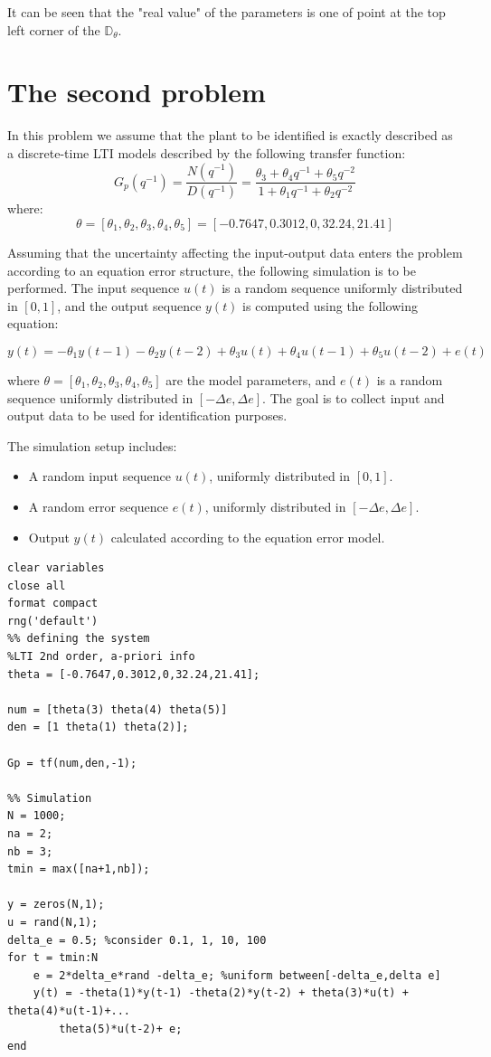 It can be seen that the "real value" of the parameters is one of point at the top left corner of the \(\mathbb{D}_\theta\).

\section{The second problem}
In this problem we assume that the plant to be identified is exactly described as a discrete-time
LTI models described by the following transfer function:
\[
G_p(q^{-1}) = \frac{N(q^{-1})}{D(q^{-1})} = \frac{\theta_3 + \theta_4 q^{-1} + \theta_5 q^{-2}}{1 + \theta_1 q^{-1} + \theta_2 q^{-2}} \tag{5}
\]
where:
\[
\theta = [\theta_1, \theta_2, \theta_3, \theta_4, \theta_5] = [-0.7647, 0.3012, 0, 32.24, 21.41]
\]


Assuming that the uncertainty affecting the input-output data enters the problem according to an equation error structure, the following simulation is to be performed. The input sequence \( u(t) \) is a random sequence uniformly distributed in \([0, 1]\), and the output sequence \( y(t) \) is computed using the following equation:

\[
    y(t) = -\theta_1 y(t-1) - \theta_2 y(t-2) + \theta_3 u(t) + \theta_4 u(t-1) + \theta_5 u(t-2) + e(t) \tag{7}
\]

where \( \theta = [\theta_1, \theta_2, \theta_3, \theta_4, \theta_5] \) are the model parameters, and \( e(t) \) is a random sequence uniformly distributed in \([- \Delta e, \Delta e]\). The goal is to collect input and output data to be used for identification purposes.

The simulation setup includes:
\begin{itemize}
    \item A random input sequence \( u(t) \), uniformly distributed in \([0, 1]\).
    \item A random error sequence \( e(t) \), uniformly distributed in \([- \Delta e, \Delta e]\).
    \item Output \( y(t) \) calculated according to the equation error model.
\end{itemize}


\begin{example}
\begin{lstlisting}[caption=Set-membership estimation with theta bounds and simulation]
clear variables
close all
format compact
rng('default')
%% defining the system
%LTI 2nd order, a-priori info
theta = [-0.7647,0.3012,0,32.24,21.41];

num = [theta(3) theta(4) theta(5)]
den = [1 theta(1) theta(2)];

Gp = tf(num,den,-1);

%% Simulation
N = 1000;
na = 2;
nb = 3;
tmin = max([na+1,nb]);

y = zeros(N,1);
u = rand(N,1);
delta_e = 0.5; %consider 0.1, 1, 10, 100
for t = tmin:N
    e = 2*delta_e*rand -delta_e; %uniform between[-delta_e,delta e]
    y(t) = -theta(1)*y(t-1) -theta(2)*y(t-2) + theta(3)*u(t) + theta(4)*u(t-1)+...
        theta(5)*u(t-2)+ e;
end
\end{lstlisting}
\end{example}

